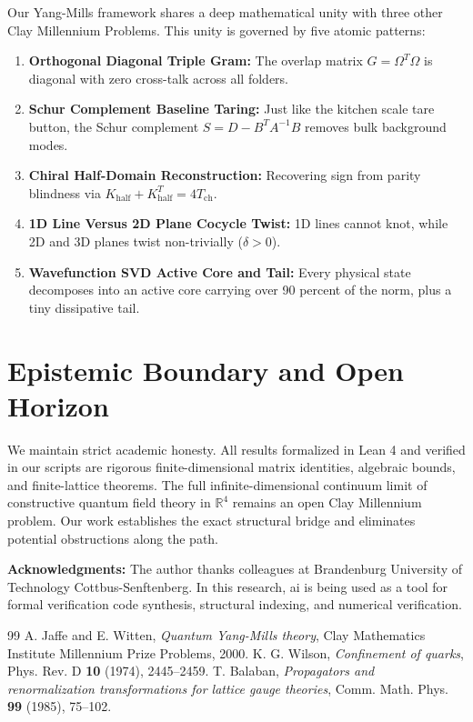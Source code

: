 \documentclass[11pt,a4paper]{article}
\theoremstyle{definition}
\begin{document}
Our Yang-Mills framework shares a deep mathematical unity with three other Clay Millennium Problems. This unity is governed by five atomic patterns:
\begin{enumerate}
  \item \textbf{Orthogonal Diagonal Triple Gram:} The overlap matrix $G = \Omega^T \Omega$ is diagonal with zero cross-talk across all folders.
  \item \textbf{Schur Complement Baseline Taring:} Just like the kitchen scale tare button, the Schur complement $S = D - B^T A^{-1} B$ removes bulk background modes.
  \item \textbf{Chiral Half-Domain Reconstruction:} Recovering sign from parity blindness via $K_{\mathrm{half}} + K_{\mathrm{half}}^T = 4 T_{\mathrm{ch}}$.
  \item \textbf{1D Line Versus 2D Plane Cocycle Twist:} 1D lines cannot knot, while 2D and 3D planes twist non-trivially ($\delta > 0$).
  \item \textbf{Wavefunction SVD Active Core and Tail:} Every physical state decomposes into an active core carrying over 90 percent of the norm, plus a tiny dissipative tail.
\end{enumerate}

\section{Epistemic Boundary and Open Horizon}

We maintain strict academic honesty. All results formalized in Lean 4 and verified in our scripts are rigorous finite-dimensional matrix identities, algebraic bounds, and finite-lattice theorems. The full infinite-dimensional continuum limit of constructive quantum field theory in $\mathbb{R}^4$ remains an open Clay Millennium problem. Our work establishes the exact structural bridge and eliminates potential obstructions along the path.

\vspace{1em}
\noindent\textbf{Acknowledgments:} The author thanks colleagues at Brandenburg University of Technology Cottbus-Senftenberg. In this research, ai is being used as a tool for formal verification code synthesis, structural indexing, and numerical verification.

\begin{thebibliography}{99}
 A. Jaffe and E. Witten, \emph{Quantum Yang-Mills theory}, Clay Mathematics Institute Millennium Prize Problems, 2000.
 K. G. Wilson, \emph{Confinement of quarks}, Phys. Rev. D \textbf{10} (1974), 2445--2459.
 T. Balaban, \emph{Propagators and renormalization transformations for lattice gauge theories}, Comm. Math. Phys. \textbf{99} (1985), 75--102.
\end{thebibliography}
\end{document}

